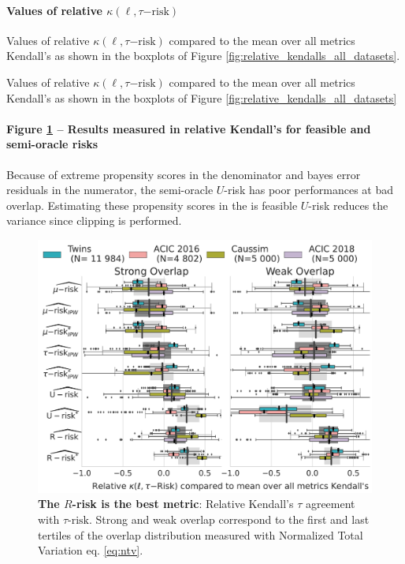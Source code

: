\documentclass[french,12pt,twoside,a4paper]{book}
\begin{document}
\begin{appendices}
  \paragraph{Values of relative $\kappa(\ell,\tau\mathrm{{-risk}})$}

  Values of relative $\kappa(\ell,\tau\mathrm{{-risk}})$ compared to
  the mean over all metrics Kendall's as shown in the boxplots of Figure \ref{fig:relative_kendalls_all_datasets}.

  \begin{table}
    \centering
    \resizebox{0.7\textwidth}{!}{
      
    }
    \caption{Values of relative $\kappa(\ell,\tau\mathrm{{-risk}})$ compared to
      the mean over all metrics Kendall's as shown in the boxplots of Figure
      \ref{fig:relative_kendalls_all_datasets}}\label{apd:table:relative_kendalls_all_datasets}
  \end{table}


  \paragraph{Figure \ref{apd:fig:relative_kendalls_all_datasets_all_metrics} --
    Results measured in relative Kendall's for feasible and semi-oracle risks}

  Because of extreme propensity scores in the denominator and bayes error residuals in the numerator, the semi-oracle
  $U$-risk has poor performances at bad overlap. Estimating these propensity scores in the is feasible $U$-risk reduces
  the variance since clipping is performed.

  \begin{figure}[!b]
    \centering
    \includegraphics[width=\linewidth]{img/chapter_5/_1_r_risk_domination_r_risk_domination__ref_metric_mean_risks_by_Dataset.pdf}
    \caption{\textbf{The $R$-risk is the best metric}: Relative Kendall's $\tau$
      agreement with $\tau\text{-risk}$. Strong and weak overlap correspond to
      the first and last tertiles of the overlap distribution measured with
      Normalized Total Variation eq. \ref{eq:ntv}.
    }\label{apd:fig:relative_kendalls_all_datasets_all_metrics}
  \end{figure}


\end{appendices}
\end{document}
